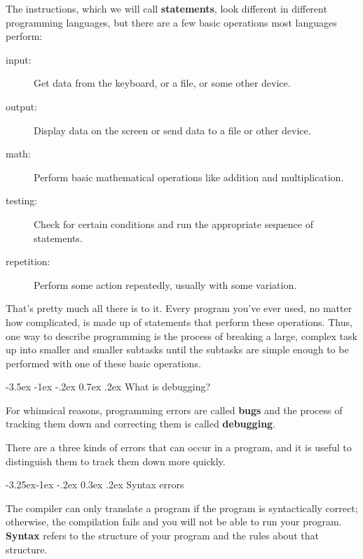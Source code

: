 \documentclass{book}
\makeatletter
\renewcommand{\section}{\@startsection 
    {section} {1} {0mm}%
    {-3.5ex \@plus -1ex \@minus -.2ex}%
    {0.7ex \@plus.2ex}%
    {\normalfont\Large\bfseries}}
\renewcommand\subsection{\@startsection {subsection}{2}{0mm}%
    {-3.25ex\@plus -1ex \@minus -.2ex}%
    {0.3ex \@plus .2ex}%
    {\normalfont\large\bfseries}}
\makeatother
\begin{document}
The instructions, which we will call {\bf statements}, look different
in different programming languages, but there are a few basic
operations most languages perform:

\begin{description}

\item[input:] Get data from the keyboard, or a file, or some
other device.

\item[output:] Display data on the screen or send data to a
file or other device.

\item[math:] Perform basic mathematical operations like addition and
multiplication.

\item[testing:] Check for certain conditions and run the
appropriate sequence of statements.

\item[repetition:] Perform some action repeatedly, usually with
some variation.

\end{description}

That's pretty much all there is to it.
Every program you've ever used, no matter how complicated, is
made up of statements that perform these operations.  Thus,
one way to describe programming is the process of breaking a
large, complex task up into smaller and smaller subtasks
until the subtasks are simple enough to be performed
with one of these basic operations.


\section{What is debugging?}

For whimsical reasons,
programming errors are called {\bf bugs} and the process
of tracking them down and correcting them is called
{\bf debugging}.

There are a three kinds of errors that can occur
in a program, and it is useful to distinguish them
to track them down more quickly.

\subsection{Syntax errors}

The compiler can only translate a program if the program is
syntactically correct; otherwise, the compilation fails and
you will not be able to run your program.  {\bf Syntax}
refers to the structure of your program and the rules about
that structure.
\end{document}
